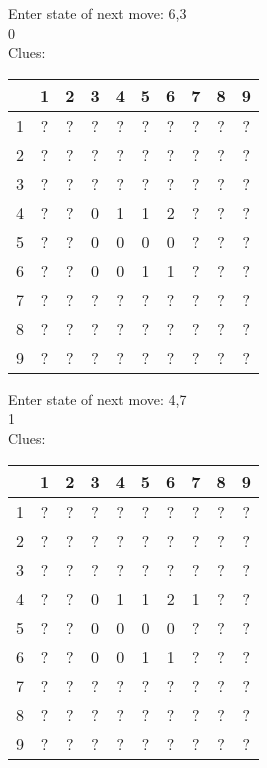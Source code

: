 Enter state of next move: 6,3\\
0\\
Clues:\\
\begin{tabular}{|c|c|c|c|c|c|c|c|c|c|}
\hline
  & 1 & 2 & 3 & 4 & 5 & 6 & 7 & 8 & 9\\
\hline
1 & ? & ? & ? & ? & ? & ? & ? & ? & ?\\
\hline
2 & ? & ? & ? & ? & ? & ? & ? & ? & ?\\
\hline
3 & ? & ? & ? & ? & ? & ? & ? & ? & ?\\
\hline
4 & ? & ? & 0 & 1 & 1 & 2 & ? & ? & ?\\
\hline
5 & ? & ? & 0 & 0 & 0 & 0 & ? & ? & ?\\
\hline
6 & ? & ? & 0 & 0 & 1 & 1 & ? & ? & ?\\
\hline
7 & ? & ? & ? & ? & ? & ? & ? & ? & ?\\
\hline
8 & ? & ? & ? & ? & ? & ? & ? & ? & ?\\
\hline
9 & ? & ? & ? & ? & ? & ? & ? & ? & ?\\
\hline
\end{tabular}

Enter state of next move: 4,7\\
1\\
Clues:\\
\begin{tabular}{|c|c|c|c|c|c|c|c|c|c|}
\hline
  & 1 & 2 & 3 & 4 & 5 & 6 & 7 & 8 & 9\\
\hline
1 & ? & ? & ? & ? & ? & ? & ? & ? & ?\\
\hline
2 & ? & ? & ? & ? & ? & ? & ? & ? & ?\\
\hline
3 & ? & ? & ? & ? & ? & ? & ? & ? & ?\\
\hline
4 & ? & ? & 0 & 1 & 1 & 2 & 1 & ? & ?\\
\hline
5 & ? & ? & 0 & 0 & 0 & 0 & ? & ? & ?\\
\hline
6 & ? & ? & 0 & 0 & 1 & 1 & ? & ? & ?\\
\hline
7 & ? & ? & ? & ? & ? & ? & ? & ? & ?\\
\hline
8 & ? & ? & ? & ? & ? & ? & ? & ? & ?\\
\hline
9 & ? & ? & ? & ? & ? & ? & ? & ? & ?\\
\hline
\end{tabular}


